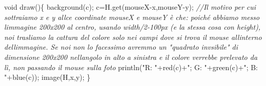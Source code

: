 \documentclass[
]{article}
\newenvironment{Shaded}{}{}
\newcommand{\CommentTok}[1]{\textcolor[rgb]{0.38,0.63,0.69}{\textit{#1}}}
\newcommand{\DataTypeTok}[1]{\textcolor[rgb]{0.56,0.13,0.00}{#1}}
\newcommand{\FunctionTok}[1]{\textcolor[rgb]{0.02,0.16,0.49}{#1}}
\newcommand{\NormalTok}[1]{#1}
\newcommand{\OperatorTok}[1]{\textcolor[rgb]{0.40,0.40,0.40}{#1}}
\newcommand{\StringTok}[1]{\textcolor[rgb]{0.25,0.44,0.63}{#1}}
\begin{document}
\begin{Shaded}
\begin{Highlighting}[]
\DataTypeTok{void} \FunctionTok{draw}\OperatorTok{()\{}
  \FunctionTok{background}\OperatorTok{(}\NormalTok{c}\OperatorTok{);}
\NormalTok{  c}\OperatorTok{=}\NormalTok{H}\OperatorTok{.}\FunctionTok{get}\OperatorTok{(}\NormalTok{mouseX}\OperatorTok{{-}}\NormalTok{x}\OperatorTok{,}\NormalTok{mouseY}\OperatorTok{{-}}\NormalTok{y}\OperatorTok{);} \CommentTok{//Il motivo per cui sottraiamo x e y allce coordinate mouseX e mouseY è che: poiché abbiamo messo l\textquotesingle{}immagine 200x200 al centro, usando width/2{-}100px (e la stessa cosa con height), noi trasliamo la cattura del colore solo nei campi dove si trova il mouse all\textquotesingle{}interno dell\textquotesingle{}immagine. Se noi non lo facessimo avremmo un "quadrato invsibile" di dimensione 200x200 nell\textquotesingle{}angolo in alto a sinistra e il colore verrebbe prelevato da lì, non passando il mouse sulla foto}
  \FunctionTok{println}\OperatorTok{(}\StringTok{"R: "}\OperatorTok{+}\FunctionTok{red}\OperatorTok{(}\NormalTok{c}\OperatorTok{)+}\StringTok{"; G: "}\OperatorTok{+}\FunctionTok{green}\OperatorTok{(}\NormalTok{c}\OperatorTok{)+}\StringTok{"; B: "}\OperatorTok{+}\FunctionTok{blue}\OperatorTok{(}\NormalTok{c}\OperatorTok{));}
  \FunctionTok{image}\OperatorTok{(}\NormalTok{H}\OperatorTok{,}\NormalTok{x}\OperatorTok{,}\NormalTok{y}\OperatorTok{);}
\OperatorTok{\}}
\end{Highlighting}
\end{Shaded}
\end{document}
